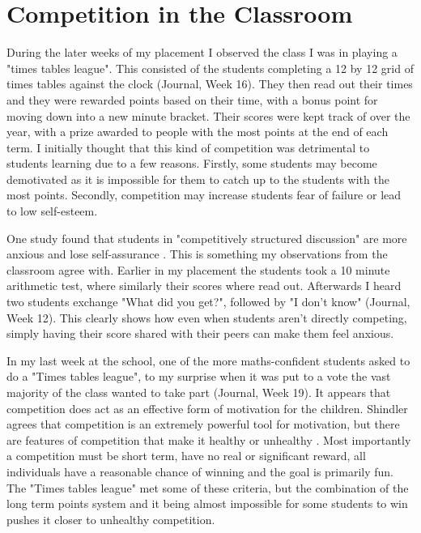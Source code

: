 \documentclass[11pt, a4paper, notitlepage]{article}
\begin{document}
\section*{Competition in the Classroom}
During the later weeks of my placement I observed the class I was in playing a "times tables league". This consisted of the students completing a 12 by 12 grid of times tables against the clock (Journal, Week 16). They then read out their times and they were rewarded points based on their time, with a bonus point for moving down into a new minute bracket. Their scores were kept track of over the year, with a prize awarded to people with the most points at the end of each term. I initially thought that this kind of competition was  detrimental to students learning due to a few reasons. Firstly, some students may become demotivated as it is impossible for them to catch up to the students with the most points. Secondly, competition may increase students fear of failure or lead to low self-esteem. 
\par
One study found that students in "competitively structured discussion" are more anxious and lose self-assurance \cite{Roger:1973}. This is something my observations from the classroom agree with. Earlier in my placement the students took a 10 minute arithmetic test, where similarly their scores where read out. Afterwards I heard two students exchange "What did you get?", followed by "I don't know" (Journal, Week 12). This clearly shows how even when students aren't directly competing, simply having their score shared with their peers can make them feel anxious. 
\par
In my last week at the school, one of the more maths-confident students asked to do a "Times tables league", to my surprise when it was put to a vote the vast majority of the class wanted to take part (Journal, Week 19). It appears that competition does act as an effective form of motivation for the children. Shindler agrees that competition is an extremely powerful tool for motivation, but there are features of competition that make it healthy or unhealthy \cite{Shindler:2009}. Most importantly a competition must be short term, have no real or significant reward, all individuals have a reasonable chance of winning and the goal is primarily fun. The "Times tables league" met some of these criteria, but the combination of the long term points system and it being almost impossible for some students to win pushes it closer to unhealthy competition. 
\par
\end{document}
